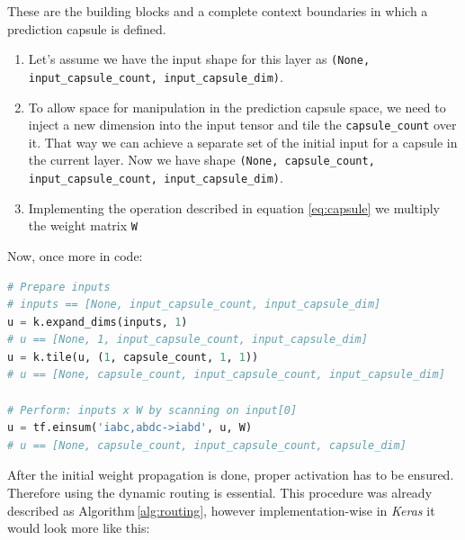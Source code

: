 These are the building blocks and a complete context boundaries in which a prediction capsule is defined.

\begin{enumerate}
    \item Let's assume we have the input shape for this layer as \texttt{(None, input\_capsule\_count, input\_capsule\_dim)}.
    \item To allow space for manipulation in the prediction capsule space, we need to inject a new dimension into the input tensor and tile the \texttt{capsule\_count} over it. That way we can achieve a separate set of the initial input for a capsule in the current layer. Now we have shape \texttt{(None, capsule\_count, input\_capsule\_count, input\_capsule\_dim)}.
    \item Implementing the operation described in equation \ref{eq:capsule} we multiply the weight matrix \texttt{W}
\end{enumerate}

Now, once more in code:

\begin{lstlisting}[language=Python, caption=Prediction capsule call without routing]
# Prepare inputs
# inputs == [None, input_capsule_count, input_capsule_dim]
u = k.expand_dims(inputs, 1)
# u == [None, 1, input_capsule_count, input_capsule_dim]
u = k.tile(u, (1, capsule_count, 1, 1))
# u == [None, capsule_count, input_capsule_count, input_capsule_dim]

# Perform: inputs x W by scanning on input[0]
u = tf.einsum('iabc,abdc->iabd', u, W)
# u == [None, capsule_count, input_capsule_count, capsule_dim]
\end{lstlisting}

After the initial weight propagation is done, proper activation has to be ensured. Therefore using the dynamic routing is essential. This procedure was already described as Algorithm\,\ref{alg:routing}, however implementation-wise in \textit{Keras} it would look more like this:


